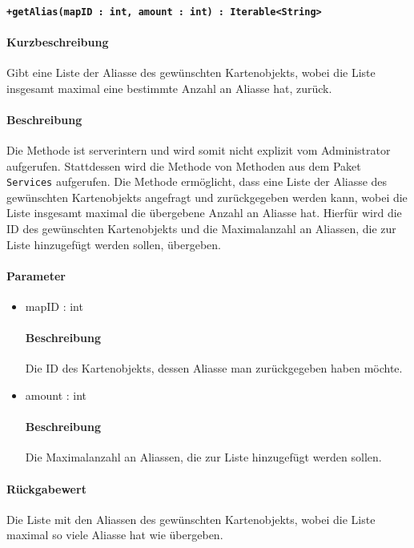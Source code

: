 \paragraph*{\texttt{+getAlias(mapID : int, amount : int) : Iterable<String>}}%
\paragraph*{Kurzbeschreibung}
Gibt eine Liste der Aliasse des gewünschten Kartenobjekts, wobei die Liste insgesamt maximal eine bestimmte Anzahl an Aliasse hat, zurück.
\paragraph*{Beschreibung}
Die Methode ist serverintern und wird somit nicht explizit vom Administrator aufgerufen.
Stattdessen wird die Methode von Methoden aus dem Paket \texttt{Services} aufgerufen.
Die Methode ermöglicht, dass eine Liste der Aliasse des gewünschten Kartenobjekts angefragt und zurückgegeben werden kann, wobei die Liste insgesamt maximal die übergebene Anzahl an Aliasse hat.
Hierfür wird die ID des gewünschten Kartenobjekts und die Maximalanzahl an Aliassen, die zur Liste hinzugefügt werden sollen, übergeben.
\paragraph*{Parameter}
\begin{itemize}
    \item mapID : int
    		\paragraph*{Beschreibung}
    		Die ID des Kartenobjekts, dessen Aliasse man zurückgegeben haben möchte.
    	\item amount : int
    		\paragraph*{Beschreibung}
    		Die Maximalanzahl an Aliassen, die zur Liste hinzugefügt werden sollen.
\end{itemize}
\paragraph*{Rückgabewert}
Die Liste mit den Aliassen des gewünschten Kartenobjekts, wobei die Liste maximal so viele Aliasse hat wie übergeben.

